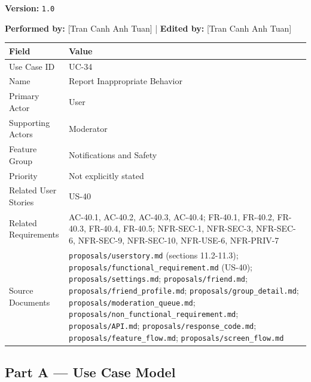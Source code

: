 \documentclass[12pt]{article}
\renewcommand{\baselinestretch}{1.5}
\begin{document}
\textbf{Version:} \texttt{1.0}
\par\medskip

\textbf{Performed by:} [Tran Canh Anh Tuan] | \textbf{Edited by:} [Tran Canh Anh Tuan]
\par\medskip

\begingroup
\small
\renewcommand{\baselinestretch}{1.0}\selectfont
\renewcommand{\arraystretch}{1.15}
\setlength{\tabcolsep}{6pt}
\begin{longtable}{|>{\raggedright\arraybackslash}p{}|>{\raggedright\arraybackslash}p{}|}
\hline
\textbf{Field} & \textbf{Value} \\ \hline
\endhead
Use Case ID & UC-34 \\ \hline
Name & Report Inappropriate Behavior \\ \hline
Primary Actor & User \\ \hline
Supporting Actors & Moderator \\ \hline
Feature Group & Notifications and Safety \\ \hline
Priority & Not explicitly stated \\ \hline
Related User Stories & US-40 \\ \hline
Related Requirements & AC-40.1, AC-40.2, AC-40.3, AC-40.4; FR-40.1, FR-40.2, FR-40.3, FR-40.4, FR-40.5; NFR-SEC-1, NFR-SEC-3, NFR-SEC-6, NFR-SEC-9, NFR-SEC-10, NFR-USE-6, NFR-PRIV-7 \\ \hline
Source Documents & \texttt{proposals/userstory.md} (sections 11.2-11.3); \texttt{proposals/functional\_requirement.md} (US-40); \texttt{proposals/settings.md}; \texttt{proposals/friend.md}; \texttt{proposals/friend\_profile.md}; \texttt{proposals/group\_detail.md}; \texttt{proposals/moderation\_queue.md}; \texttt{proposals/non\_functional\_requirement.md}; \texttt{proposals/API.md}; \texttt{proposals/response\_code.md}; \texttt{proposals/feature\_flow.md}; \texttt{proposals/screen\_flow.md} \\ \hline
\end{longtable}
\endgroup
\par\medskip

\hypertarget{sec:part-a-use-case-model}{}
\subsection*{Part A --- Use Case Model}
\par\medskip

\hypertarget{sec:a1-focused-use-case-diagram}{}
\end{document}
